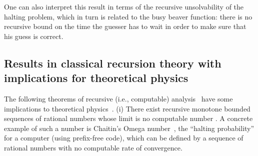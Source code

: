 \documentclass[rmp,amsfonts,showpacs,showkeys,twocolumn]{revtex4}
\begin{document}
%
%
%

One can also interpret this result in terms of the recursive
unsolvability of the halting problem, which in turn is related to the busy beaver function:
there is no recursive bound on the
time the guesser has to wait in order to make sure that his guess is
correct.


\subsection{Results in classical recursion theory with implications for theoretical physics}


The following theorems of recursive (i.e., computable) analysis~\cite{aberth-80,Weihrauch} have some
implications to theoretical physics~\cite{kreisel}.
(i)
There exist recursive monotone bounded sequences of rational numbers
whose limit is no computable number
\cite{Specker49}.
A concrete example of such a number is Chaitin's Omega number~\cite{chaitin3,calude:02,calude-dinneen06},
the ``halting probability'' for a computer (using prefix-free code),
which can be defined by a sequence of rational numbers
with no computable rate of convergence.
\end{document}
